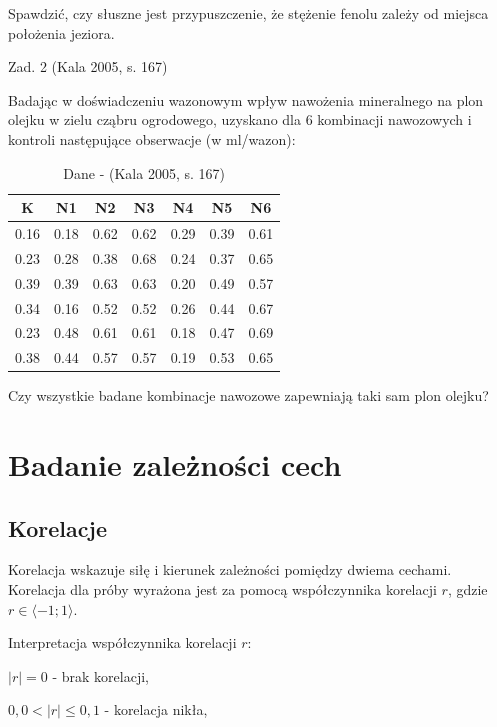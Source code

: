 \documentclass[12pt,B5paper,]{book}
\begin{document}
Spawdzić, czy słuszne jest przypuszczenie, że stężenie fenolu zależy od
miejsca położenia jeziora.

\vspace{0.8cm} Zad. 2 (Kala 2005, s. 167)

Badając w doświadczeniu wazonowym wpływ nawożenia mineralnego na plon
olejku w zielu cząbru ogrodowego, uzyskano dla 6 kombinacji nawozowych i
kontroli następujące obserwacje (w ml/wazon):

\begin{table}[H]
\centering
\caption{Dane - (Kala 2005, s. 167)}
\label{Kala167}
\begin{tabular}{ccccccc}
\hline
K    & N1   & N2   & N3   & N4   & N5   & N6   \\ \hline
0.16 & 0.18 & 0.62 & 0.62 & 0.29 & 0.39 & 0.61 \\
0.23 & 0.28 & 0.38 & 0.68 & 0.24 & 0.37 & 0.65 \\
0.39 & 0.39 & 0.63 & 0.63 & 0.20 & 0.49 & 0.57 \\
0.34 & 0.16 & 0.52 & 0.52 & 0.26 & 0.44 & 0.67 \\
0.23 & 0.48 & 0.61 & 0.61 & 0.18 & 0.47 & 0.69 \\
0.38 & 0.44 & 0.57 & 0.57 & 0.19 & 0.53 & 0.65 \\ \hline
\end{tabular}
\end{table}

Czy wszystkie badane kombinacje nawozowe zapewniają taki sam plon
olejku?

\chapter{Badanie zależności cech}\label{badanie-zaleznosci-cech}

\section{Korelacje}\label{korelacje}

Korelacja wskazuje siłę i kierunek zależności pomiędzy dwiema cechami.
Korelacja dla próby wyrażona jest za pomocą współczynnika korelacji
\(r\), gdzie \(r \in \langle -1; 1 \rangle\).

\vspace{0.8cm}

Interpretacja współczynnika korelacji \(r\):

\(|r| = 0\) - brak korelacji,

\(0,0 < |r| \leq 0,1\) - korelacja nikła,
\end{document}
